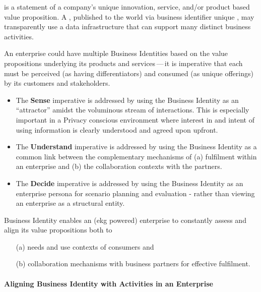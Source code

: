  is a statement of a company's unique innovation, service, and/or product based
value proposition.
A , published to the world via business identifier unique ,
may transparently use a data infrastructure that can support many distinct business activities.

An enterprise could have multiple Business Identities based on the value propositions underlying its
products and services\,---\,it is imperative that each must be perceived (as having differentiators) and
consumed (as unique offerings) by its customers and stakeholders.

\begin{itemize}
    \item The \textbf{Sense} imperative is addressed by using the Business Identity
          as an “attractor” amidst the voluminous stream of interactions.
          This is especially important in a Privacy conscious environment where interest in and intent of using
          information is clearly understood and agreed upon upfront.
    \item The \textbf{Understand} imperative is addressed by using the Business Identity as a common link between the
          complementary mechanisms of (a) fulfilment within an enterprise and (b) the collaboration contexts with
          the partners.
    \item The \textbf{Decide} imperative is addressed by using the Business Identity as an enterprise persona for scenario
          planning and evaluation - rather than viewing an enterprise as a structural entity.
\end{itemize}

Business Identity enables an (\gls{ekg} powered) enterprise to constantly assess and align its value propositions
both to

\begin{itemize}
    \item[(a)] needs and use contexts of consumers and
    \item[(b)] collaboration mechanisms with business partners for effective fulfilment.
\end{itemize}

\paragraph*{Aligning Business Identity with Activities in an Enterprise}

